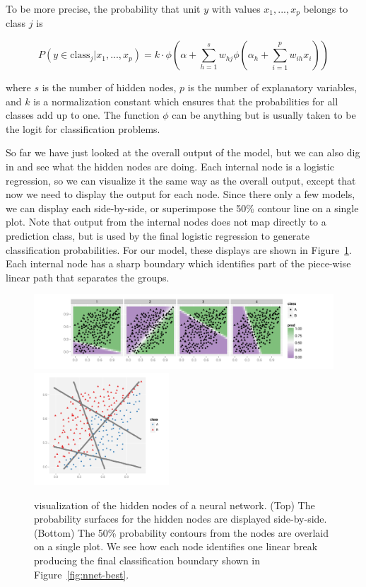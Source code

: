 \documentclass[preprint]{imsart}
\begin{document}
To be more precise, the probability that unit $y$ with values $x_{1}, ..., x_{p}$ belongs to class $j$ is

\[
P(y \in \textrm{class}_j | x_{1}, ..., x_{p}) = k \cdot \phi ( \alpha + \sum_{h=1}^s w_{hj} \phi (\alpha_h + \sum_{i=1}^p w_{ih} x_i ))
\]

\noindent where $s$ is the number of hidden nodes, $p$ is the number of explanatory variables, and $k$ is a normalization constant which ensures that the probabilities for all classes add up to one.  The function $\phi$ can be anything but is usually taken to be the logit for classification problems.

So far we have just looked at the overall output of the model, but we can also dig in and see what the hidden nodes are doing.  Each internal node is a logistic regression, so we can visualize it the same way as the overall output, except that now we need to display the output for each node.  Since there only a few models, we can display each side-by-side, or  superimpose the 50\% contour line on a single plot.  Note that output from the internal nodes does not map directly to a prediction class, but is used by the final logistic regression to generate classification probabilities. For our model, these displays are shown in Figure~\ref{fig:nnet-internal}.  Each internal node has a sharp boundary which identifies part of the piece-wise linear path that separates the groups.

\begin{figure}[htbp]
  \centering
    \includegraphics[width=6in]{nnet-hidden-fill}
    \includegraphics[width=0.45\textwidth]{nnet-hidden-contour}
  \caption{visualization of the hidden nodes of a neural network.  (Top) The probability surfaces for the hidden nodes are displayed side-by-side.  (Bottom) The 50\% probability contours from the nodes are overlaid on a single plot.  We see how each node identifies one linear break producing the final classification boundary shown in Figure~\ref{fig:nnet-best}.}
  \label{fig:nnet-internal}
\end{figure}
\end{document}

